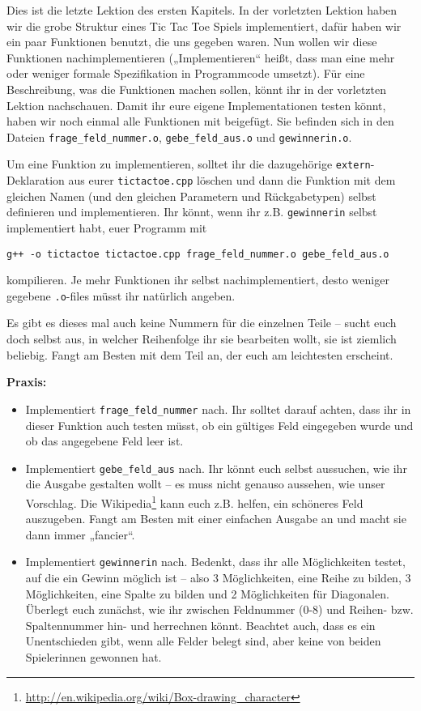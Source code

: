 
Dies ist die letzte Lektion des ersten Kapitels. In der vorletzten Lektion
haben wir die grobe Struktur eines Tic Tac Toe Spiels implementiert, dafür
haben wir ein paar Funktionen benutzt, die uns gegeben waren. Nun wollen wir
diese Funktionen nachimplementieren („Implementieren“ heißt, dass man eine mehr
oder weniger formale Spezifikation in Programmcode umsetzt). Für eine
Beschreibung, was die Funktionen machen sollen, könnt ihr in der vorletzten
Lektion nachschauen. Damit ihr eure eigene Implementationen testen könnt, haben
wir noch einmal alle Funktionen mit beigefügt. Sie befinden sich in den Dateien
\texttt{frage\_feld\_nummer.o}, \texttt{gebe\_feld\_aus.o} und
\texttt{gewinnerin.o}.

Um eine Funktion zu implementieren, solltet ihr die dazugehörige
\texttt{extern}-Deklaration aus eurer \texttt{tictactoe.cpp} löschen und dann
die Funktion mit dem gleichen Namen (und den gleichen Parametern und
Rückgabetypen) selbst definieren und implementieren. Ihr könnt, wenn ihr z.B.
\texttt{gewinnerin} selbst implementiert habt, euer Programm mit

\texttt{g++ -o tictactoe tictactoe.cpp frage\_feld\_nummer.o gebe\_feld\_aus.o}

kompilieren. Je mehr Funktionen ihr selbst nachimplementiert, desto weniger
gegebene \texttt{.o}-files müsst ihr natürlich angeben.

Es gibt es dieses mal auch keine Nummern für die einzelnen Teile -- sucht euch
doch selbst aus, in welcher Reihenfolge ihr sie bearbeiten wollt, sie ist
ziemlich beliebig. Fangt am Besten mit dem Teil an, der euch am leichtesten
erscheint.

\textbf{Praxis:}
\begin{itemize}
    \item Implementiert \texttt{frage\_feld\_nummer} nach. Ihr solltet darauf
        achten, dass ihr in dieser Funktion auch testen müsst, ob ein gültiges
        Feld eingegeben wurde und ob das angegebene Feld leer ist.
    \item Implementiert \texttt{gebe\_feld\_aus} nach. Ihr könnt euch selbst
        aussuchen, wie ihr die Ausgabe gestalten wollt -- es muss nicht genauso
        aussehen, wie unser Vorschlag. Die
        Wikipedia\footnote{\url{http://en.wikipedia.org/wiki/Box-drawing_character}}
        kann euch z.B. helfen, ein schöneres Feld auszugeben. Fangt am Besten
        mit einer einfachen Ausgabe an und macht sie dann immer „fancier“.
    \item Implementiert \texttt{gewinnerin} nach. Bedenkt, dass ihr alle
        Möglichkeiten testet, auf die ein Gewinn möglich ist -- also 3
        Möglichkeiten, eine Reihe zu bilden, 3 Möglichkeiten, eine Spalte zu
        bilden und 2 Möglichkeiten für Diagonalen. Überlegt euch zunächst, wie
        ihr zwischen Feldnummer (0-8) und Reihen- bzw. Spaltennummer hin- und
        herrechnen könnt. Beachtet auch, dass es ein Unentschieden gibt, wenn
        alle Felder belegt sind, aber keine von beiden Spielerinnen gewonnen
        hat.
\end{itemize}
